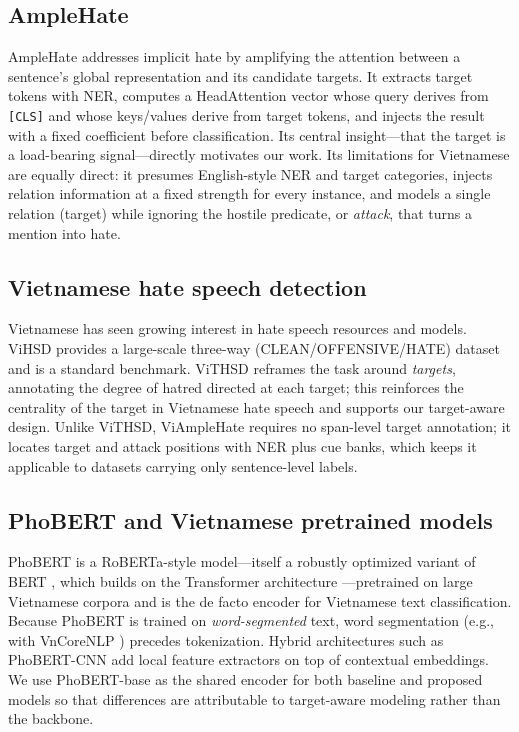 \documentclass[11pt]{article}
\begin{document}
\subsection{AmpleHate}
AmpleHate \citep{amplehate} addresses implicit hate by amplifying the attention between a sentence's global representation and its candidate targets. It extracts target tokens with NER, computes a HeadAttention vector whose query derives from \texttt{[CLS]} and whose keys/values derive from target tokens, and injects the result with a fixed coefficient before classification. Its central insight---that the target is a load-bearing signal---directly motivates our work. Its limitations for Vietnamese are equally direct: it presumes English-style NER and target categories, injects relation information at a fixed strength for every instance, and models a single relation (target) while ignoring the hostile predicate, or \emph{attack}, that turns a mention into hate.

\subsection{Vietnamese hate speech detection}
Vietnamese has seen growing interest in hate speech resources and models. ViHSD \citep{vihsd} provides a large-scale three-way (CLEAN/OFFENSIVE/HATE) dataset and is a standard benchmark. ViTHSD \citep{vithsd} reframes the task around \emph{targets}, annotating the degree of hatred directed at each target; this reinforces the centrality of the target in Vietnamese hate speech and supports our target-aware design. Unlike ViTHSD, ViAmpleHate requires no span-level target annotation; it locates target and attack positions with NER plus cue banks, which keeps it applicable to datasets carrying only sentence-level labels.

\subsection{PhoBERT and Vietnamese pretrained models}
PhoBERT \citep{phobert} is a RoBERTa-style \citep{roberta} model---itself a robustly optimized variant of BERT \citep{bert}, which builds on the Transformer architecture \citep{transformer}---pretrained on large Vietnamese corpora and is the de facto encoder for Vietnamese text classification. Because PhoBERT is trained on \emph{word-segmented} text, word segmentation (e.g., with VnCoreNLP \citep{vncorenlp}) precedes tokenization. Hybrid architectures such as PhoBERT-CNN \citep{to2022phobertcnn} add local feature extractors on top of contextual embeddings. We use PhoBERT-base as the shared encoder for both baseline and proposed models so that differences are attributable to target-aware modeling rather than the backbone.
\end{document}
